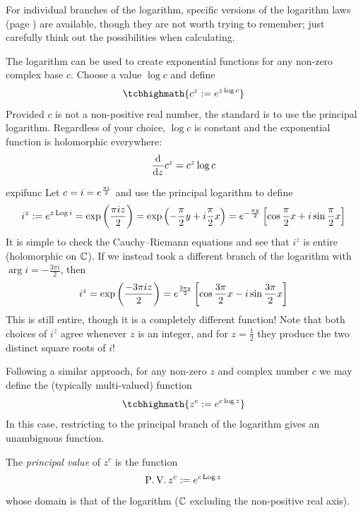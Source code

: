 For individual branches of the logarithm, specific versions of the logarithm laws (page \pageref{sec:loglaws}) are available, though they are not worth trying to remember; just carefully think out the possibilities when calculating.




The logarithm can be used to create exponential functions for any non-zero complex base $c$. Choose a value $\log c$ and define
\[
	\tcbhighmath{c^z:=e^{z\log c}}
\]
Provided $c$ is not a non-positive real number, the standard is to use the principal logarithm. Regardless of your choice, $\log c$ is constant and the exponential function is holomorphic everywhere:
\[
	\frac{\mathrm{d} }{\mathrm{d} z}c^z=c^z\log c
\]

\begin{example}{}{expifunc}
	Let $c=i=e^{\frac{\pi i}{2}}$ and use the principal logarithm to define
	\[
		i^z:=e^{z\operatorname{Log} i}=\exp\left(\frac{\pi iz}2\right) =\exp\left(-\frac\pi 2y+i\frac\pi 2x\right) =e^{-\frac{\pi y}{2}}\left[\cos\frac\pi 2x+i\sin\frac\pi 2x\right]
	\]
	It is simple to check the Cauchy--Riemann equations and see that $i^z$ is entire (holomorphic on $\mathbb{C}$).\smallbreak
	If we instead took a different branch of the logarithm with $\arg i=-\frac{3\pi i}2$, then
	\[
		i^z=\exp\left(\frac{-3\pi iz}2\right) =e^{\frac{3\pi y}{2}}\left[\cos\frac{3\pi}2x-i\sin\frac{3\pi}2x\right]
	\]
	This is still entire, though it is a completely different function! Note that both choices of $i^z$ agree whenever $z$ is an integer, and for $z=\frac 12$ they produce the two distinct square roots of $i$!
\end{example}

\goodbreak




Following a similar approach, for any non-zero $z$ and complex number $c$ we may define the (typically multi-valued) function
\[
	\tcbhighmath{z^c:=e^{c\log z}}
\]
In this case, restricting to the principal branch of the logarithm gives an unambiguous function.

\begin{defn}{}{}
	The \emph{principal value} of $z^c$ is the function
	\[
		\operatorname{P.V.}z^c:=e^{c\operatorname{Log} z}
	\]
	whose domain is that of the logarithm ($\mathbb{C}$ excluding the non-positive real axis).
\end{defn}



